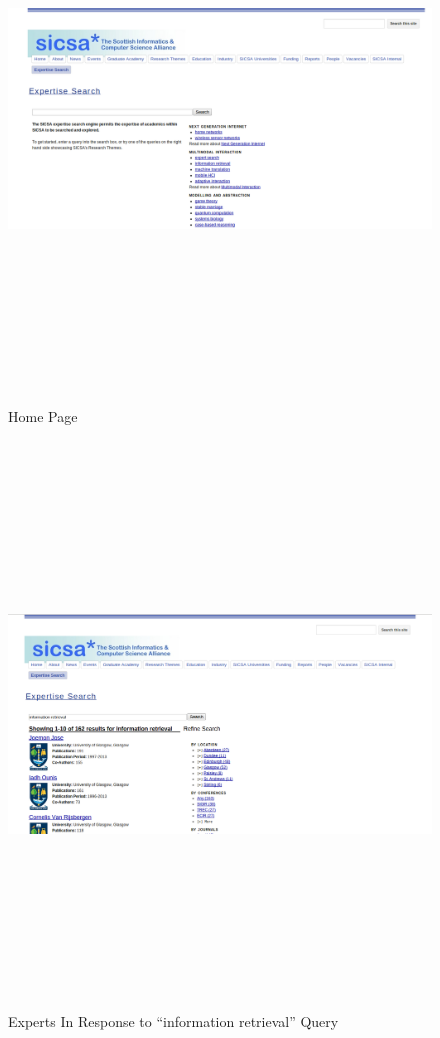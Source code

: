 \begin{figure}
 \centering
\includegraphics[width=13cm,height=15cm,keepaspectratio]{./figures/oldsicsa.png}
 \caption{Home Page} \label{fig:oldsicsa} 
 \end{figure}
 \begin{figure}
 \centering
 \includegraphics[width=13cm,height=15cm,keepaspectratio]{./figures/oldsearch.png}
 \caption{Experts In Response to ``information retrieval'' Query} \label{fig:resultspage} 
 \end{figure}
